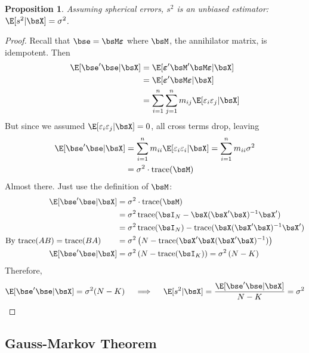\documentclass[12pt]{article}
\theoremstyle{plain}
\newtheorem{prop}[thm]{Proposition}
\theoremstyle{definition}
\theoremstyle{remark}
\newcommand{\bsvarepsilon}{\boldsymbol{\varepsilon}}
\newcommand{\trace}{\operatorname{trace}}
\newcommand{\sumin}{\sum^n_{i=1}}
\newcommand{\sumjn}{\sum^n_{j=1}}
\begin{document}
\begin{prop}
Assuming spherical errors, $s^2$ is an unbiased estimator:
$\E[s^2|\bsX]=\sigma^2$.
\end{prop}
\begin{proof}
Recall that $\bse=\bsM\bsvarepsilon$ where $\bsM$, the annihilator
matrix, is idempotent. Then
\begin{align*}
  \E[\bse'\bse|\bsX]
  &= \E[\bsvarepsilon'\bsM'\bsM\bsvarepsilon|\bsX]\\
  &= \E[\bsvarepsilon'\bsM\bsvarepsilon|\bsX] \\
  &= \sumin \sumjn m_{ij}\E[\varepsilon_i\varepsilon_j|\bsX]
\end{align*}
But since we assumed $\E[\varepsilon_i\varepsilon_j|\bsX]=0$, all cross
terms drop, leaving
\begin{align*}
  \E[\bse'\bse|\bsX]
  &= \sumin m_{ii}\E[\varepsilon_i\varepsilon_i|\bsX]
  = \sumin m_{ii}\sigma^2 \\
  &= \sigma^2 \cdot \trace(\bsM)
\end{align*}
Almost there. Just use the definition of $\bsM$:
\begin{align*}
  \E[\bse'\bse|\bsX]
  &= \sigma^2 \cdot \trace(\bsM) \\
  &= \sigma^2 \trace(\bsI_N - \bsX(\bsX'\bsX)^{-1}\bsX') \\
  &= \sigma^2 \trace(\bsI_N) - \trace(\bsX(\bsX'\bsX)^{-1}\bsX') \\
  \text{By $\trace(AB)=\trace(BA)$}\qquad
  &= \sigma^2 \left(N - \trace(\bsX'\bsX(\bsX'\bsX)^{-1})\right) \\
  \E[\bse'\bse|\bsX]
  &= \sigma^2 \left(N - \trace(\bsI_K)\right)
  = \sigma^2 \left(N - K\right)
\end{align*}
Therefore,
\begin{align*}
  \E[\bse'\bse|\bsX] = \sigma^2(N-K)
  \quad\implies\quad
  \E[s^2|\bsX] = \frac{\E[\bse'\bse|\bsX]}{N-K} = \sigma^2
\end{align*}




\end{proof}



\clearpage
\subsection{Gauss-Markov Theorem}
\end{document}
